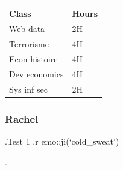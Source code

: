 \documentclass[]{article}
\begin{document}
\begin{longtable}[]{@{}ll@{}}
\toprule
\begin{minipage}[b]{0.21\columnwidth}\raggedright\strut
Class\strut
\end{minipage} & \begin{minipage}[b]{0.21\columnwidth}\raggedright\strut
Hours\strut
\end{minipage}\tabularnewline
\midrule
\endhead
\begin{minipage}[t]{0.21\columnwidth}\raggedright\strut
Web data\strut
\end{minipage} & \begin{minipage}[t]{0.21\columnwidth}\raggedright\strut
2H\strut
\end{minipage}\tabularnewline
\begin{minipage}[t]{0.21\columnwidth}\raggedright\strut
Terrorisme\strut
\end{minipage} & \begin{minipage}[t]{0.21\columnwidth}\raggedright\strut
4H\strut
\end{minipage}\tabularnewline
\begin{minipage}[t]{0.21\columnwidth}\raggedright\strut
Econ histoire\strut
\end{minipage} & \begin{minipage}[t]{0.21\columnwidth}\raggedright\strut
4H\strut
\end{minipage}\tabularnewline
\begin{minipage}[t]{0.21\columnwidth}\raggedright\strut
Dev economics\strut
\end{minipage} & \begin{minipage}[t]{0.21\columnwidth}\raggedright\strut
4H\strut
\end{minipage}\tabularnewline
\begin{minipage}[t]{0.21\columnwidth}\raggedright\strut
Sys inf sec\strut
\end{minipage} & \begin{minipage}[t]{0.21\columnwidth}\raggedright\strut
2H\strut
\end{minipage}\tabularnewline
\bottomrule
\end{longtable}

\subsubsection{Rachel}\label{rachel}

.Test 1 .r emo::ji(`cold\_sweat')

. .
\end{document}
